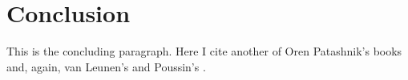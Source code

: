 \section{Conclusion}

This is the concluding paragraph.  Here I cite another of
Oren Patashnik's books\cite{btxhak} and, again,
van Leunen's and Poussin's \cite{vanleunen,primes}.